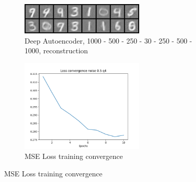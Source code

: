           \begin{figure}[!htbp]
          \begin{subfigure}
          \centering
          \includegraphics[angle=0,width=0.65\textwidth]{assign-4/logs/q4/deep_autoencoder_noise_0.5/image_5.png}
          \caption{Deep Autoencoder, 1000 - 500 - 250 - 30 - 250 - 500 - 1000, reconstruction}
          \end{subfigure}
          \begin{subfigure}
          \centering
          \includegraphics[angle=0,width=0.65\textwidth]{assign-4/logs/q4/convergence-noise-0.5.png}
          \caption{MSE Loss training convergence}
          \end{subfigure}
          \end{figure}
          
